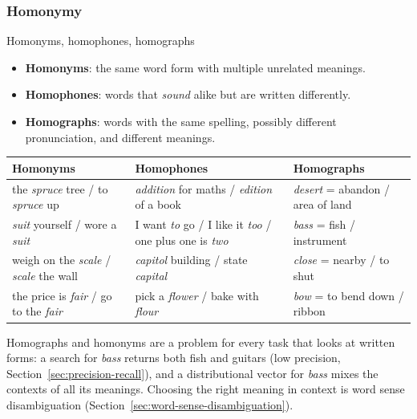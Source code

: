 \subsubsection{Homonymy}

\begin{nbdef}{Homonyms, homophones, homographs}
\begin{itemize}[nosep]
  \item \textbf{Homonyms}: the same word form with multiple unrelated meanings.
  \item \textbf{Homophones}: words that \emph{sound} alike but are written differently.
  \item \textbf{Homographs}: words with the same spelling, possibly different
        pronunciation, and different meanings.
\end{itemize}
\end{nbdef}

\begin{center}
\footnotesize
\begin{tabularx}{\linewidth}{@{}*{3}{>{\raggedright\arraybackslash}X}@{}}
\toprule
\textbf{Homonyms} & \textbf{Homophones} & \textbf{Homographs} \\
\midrule
the \emph{spruce} tree / to \emph{spruce} up & \emph{addition} for maths / \emph{edition} of a book & \emph{desert} = abandon / area of land \\
\emph{suit} yourself / wore a \emph{suit} & I want \emph{to} go / I like it \emph{too} / one plus one is \emph{two} & \emph{bass} = fish / instrument \\
weigh on the \emph{scale} / \emph{scale} the wall & \emph{capitol} building / state \emph{capital} & \emph{close} = nearby / to shut \\
the price is \emph{fair} / go to the \emph{fair} & pick a \emph{flower} / bake with \emph{flour} & \emph{bow} = to bend down / ribbon \\
\bottomrule
\end{tabularx}
\end{center}

\begin{nbwhy}
Homographs and homonyms are a problem for every task that looks at written forms: a
search for \emph{bass} returns both fish and guitars (low precision, Section~\ref{sec:precision-recall}),
and a distributional vector for \emph{bass} mixes the contexts of all its meanings.
Choosing the right meaning in context is word sense disambiguation
(Section~\ref{sec:word-sense-disambiguation}).
\end{nbwhy}
